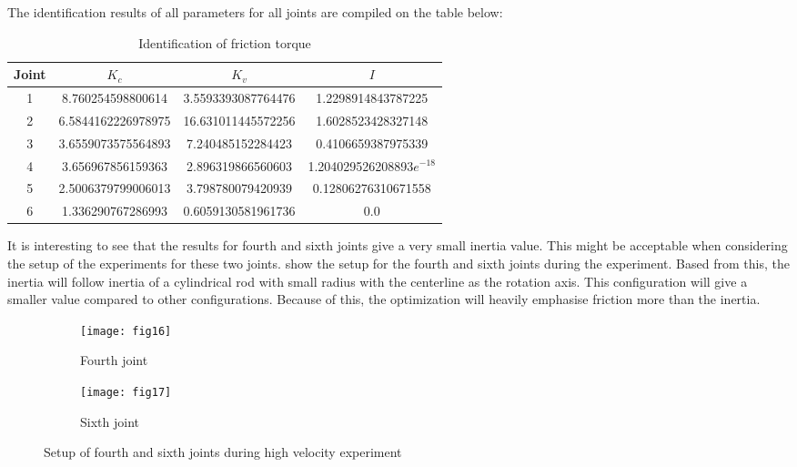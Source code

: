 The identification results of all parameters for all joints are compiled on the table below: 
\begin{table}[H]
    \centering
    \begin{tabular}{| c | c | c | c |}
    \hline
    Joint & $K_{c}$ & $K_{v}$ & $I$ \\ \hline
    1 & 8.760254598800614   & 3.5593393087764476  & 1.2298914843787225        \\ \hline
    2 & 6.5844162226978975  & 16.631011445572256  & 1.6028523428327148        \\ \hline
    3 & 3.6559073575564893  & 7.240485152284423   & 0.4106659387975339        \\ \hline
    4 & 3.656967856159363   & 2.896319866560603   & 1.204029526208893$e^{-18}$\\ \hline
    5 & 2.5006379799006013  & 3.798780079420939   & 0.12806276310671558       \\ \hline
    6 & 1.336290767286993   & 0.6059130581961736  & 0.0                       \\ \hline
    \end{tabular}
    \caption{Identification of friction torque}
    \label{table:friction}
\end{table}

It is interesting to see that the results for fourth and sixth joints give a very small inertia value. This might be acceptable when considering the setup of the experiments for these two joints.  show the setup for the fourth and sixth joints during the experiment. Based from this, the inertia will follow inertia of a cylindrical rod with small radius with the centerline as the rotation axis. This configuration will give a smaller value compared to other configurations. Because of this, the optimization will heavily emphasise friction more than the inertia.  

\begin{figure}[H]
  \begin{subfigure}[t]{0.5\textwidth}
    \centering
    \texttt{[image: fig16]} 
    \caption{Fourth joint}
  \end{subfigure}
  \begin{subfigure}[t]{0.5\textwidth}
    \centering
    \texttt{[image: fig17]}
    \caption{Sixth joint}
  \end{subfigure}
  \caption{Setup of fourth and sixth joints during high velocity experiment}
  \label{fig:joint fric setup}
\end{figure}
